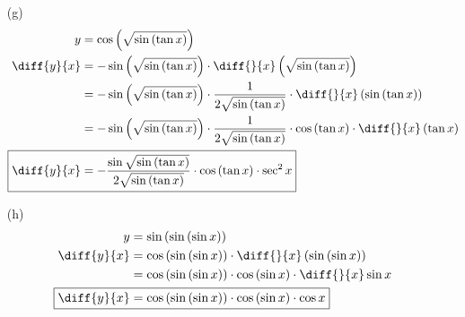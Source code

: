 \documentclass{article}
\begin{document}
\begin{itemize}
\item[(g)]
    \begin{align*}
        y&=\cos\left(\sqrt{\sin\left(\tan x\right)}\right) \\
        \diff{y}{x}&=-\sin\left(\sqrt{\sin\left(\tan x\right)}\right)\cdot\diff{}{x}\left(\sqrt{\sin\left(\tan x\right)}\right) \\
        &=-\sin\left(\sqrt{\sin\left(\tan x\right)}\right)\cdot\frac{1}{2\sqrt{\sin\left(\tan x\right)}}\cdot\diff{}{x}\left(\sin\left(\tan x\right)\right) \\
        &=-\sin\left(\sqrt{\sin\left(\tan x\right)}\right)\cdot\frac{1}{2\sqrt{\sin\left(\tan x\right)}}\cdot\cos\left(\tan x\right)\cdot\diff{}{x}\left(\tan x\right) \\
        \Aboxed{\diff{y}{x}&=-\frac{\sin\sqrt{\sin\left(\tan x\right)}}{2\sqrt{\sin\left(\tan x\right)}}\cdot\cos\left(\tan x\right)\cdot\sec^2x} \\
    \end{align*}

\item[(h)]
    \begin{align*}
        y&=\sin\left(\sin\left(\sin x\right)\right) \\
        \diff{y}{x}&=\cos\left(\sin\left(\sin x\right)\right)\cdot\diff{}{x}\left(\sin\left(\sin x\right)\right) \\
        &=\cos\left(\sin\left(\sin x\right)\right)\cdot\cos\left(\sin x\right)\cdot\diff{}{x}\sin x \\
        \Aboxed{\diff{y}{x}&=\cos\left(\sin\left(\sin x\right)\right)\cdot\cos\left(\sin x\right)\cdot\cos x} \\
    \end{align*}


\end{itemize}
\end{document}
